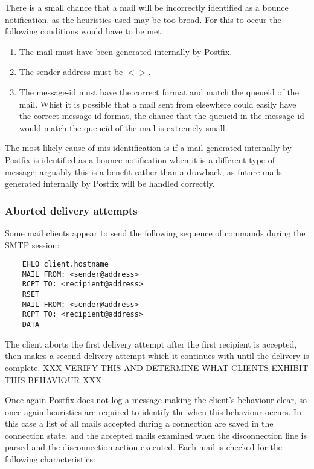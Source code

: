 \documentclass[a4paper,12pt,draft]{article}
\begin{document}
There is a small chance that a mail will be incorrectly identified as a
bounce notification, as the heuristics used may be too broad.  For this to
occur the following conditions would have to be met:

\begin{enumerate}

    \item The mail must have been generated internally by Postfix.

    \item The sender address must be $<>$.

    \item The message-id must have the correct format and match the queueid
        of the mail.  Whist it is possible that a mail sent from elsewhere
        could easily have the correct message-id format, the chance that
        the queueid in the message-id would match the queueid of the mail
        is extremely small.

\end{enumerate}

The most likely cause of mis-identification is if a mail generated
internally by Postfix is identified as a bounce notification when it is a
different type of message; arguably this is a benefit rather than a
drawback, as future mails generated internally by Postfix will be handled
correctly.

\subsubsection{Aborted delivery attempts}

\label{aborted-delivery-attempts}

Some mail clients appear to send the following sequence of commands during
the SMTP session:

\begin{verbatim}
    EHLO client.hostname
    MAIL FROM: <sender@address>
    RCPT TO: <recipient@address>
    RSET
    MAIL FROM: <sender@address>
    RCPT TO: <recipient@address>
    DATA
\end{verbatim}

The client aborts the first delivery attempt after the first recipient is
accepted, then makes a second delivery attempt which it continues with
until the delivery is complete. XXX VERIFY THIS AND DETERMINE WHAT CLIENTS
EXHIBIT THIS BEHAVIOUR XXX

Once again Postfix does not log a message making the client's behaviour
clear, so once again heuristics are required to identify the when this
behaviour occurs.  In this case a list of all mails accepted during a
connection are saved in the connection state, and the accepted mails
examined when the disconnection line is parsed and the disconnection action
executed.  Each mail is checked for the following characteristics:
\end{document}

